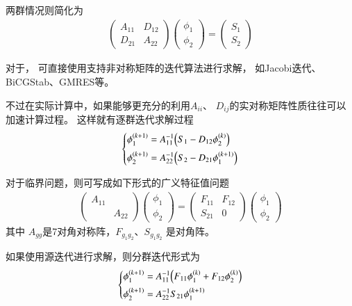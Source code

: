 两群情况则简化为
\begin{align}
  \begin{pmatrix}
  A_{11} & D_{12} \\
  D_{21} & A_{22}
  \end{pmatrix}
  \begin{pmatrix}
  \phi_1 \\ \phi_2
  \end{pmatrix}
  =
  \begin{pmatrix}
  S_1 \\ S_2
  \end{pmatrix}
  \label{equ:program.group.g2equ.fixs}
\end{align}

对于，
可直接使用支持非对称矩阵的迭代算法进行求解，
如Jacobi迭代、BiCGStab、GMRES等。

不过在实际计算中，如果能够更充分的利用$A_{ii}$、
$D_{ij}$的实对称矩阵性质往往可以加速计算过程。
这样就有逐群迭代求解过程
\begin{align}
  \left\{
  \begin{aligned}
    \phi_1^{(k+1)}&=A_{11}^{-1}\pb[B]{S_1-D_{12}\phi_2^{(k)}}\\
    \phi_2^{(k+1)}&=A_{22}^{-1}\pb[B]{S_2-D_{21}\phi_1^{(k+1)}}
  \end{aligned}
  \right.
\end{align}

对于临界问题，则可写成如下形式的广义特征值问题
\begin{align}
  \begin{pmatrix}
  A_{11} &  \\
   & A_{22}
  \end{pmatrix}
  \begin{pmatrix}
  \phi_1 \\ \phi_2
  \end{pmatrix}
  =
    \begin{pmatrix}
    F_{11} & F_{12} \\
    S_{21} & 0
    \end{pmatrix}
  \begin{pmatrix}
    \phi_1 \\ \phi_2
  \end{pmatrix}
\end{align}
其中 $A_{gg}$是7对角对称阵，$F_{g_1g_2}$、$S_{g_1g_2}$ 是对角阵。

如果使用源迭代进行求解，则分群迭代形式为
\begin{align}
  \left\{
  \begin{aligned}
    \phi_1^{(k+1)}&=A_{11}^{-1}\pb[B]{F_{11}\phi_1^{(k)}+F_{12}\phi_2^{(k)}}\\
    \phi_2^{(k+1)}&=A_{22}^{-1}S_{21}\phi_1^{(k+1)}
  \end{aligned}
  \right.
  \label{equ:program.group.g2equ.keff}
\end{align}

